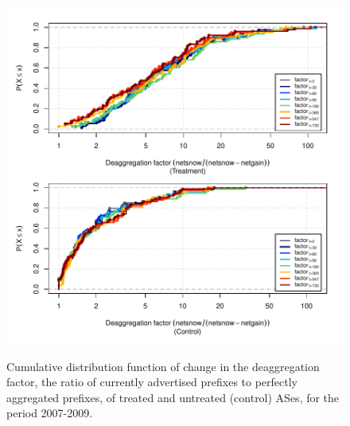 \clearpage
\vspace*{16pt}
\begin{figure}[H]
\begin{centering}
\begin{singlespace}
\captionsetup{list=no}
    \includegraphics[width=6in]
    {figures/behavior-deagg_factor-2007_2009-corr.pdf}
    \vspace{-2em}\\
    \caption{Cumulative distribution function of change in the deaggregation
    factor, the ratio of currently advertised prefixes to perfectly aggregated
    prefixes, of treated and untreated (control) ASes, for the period
    2007-2009.}
\end{singlespace}
\end{centering}
\end{figure}

